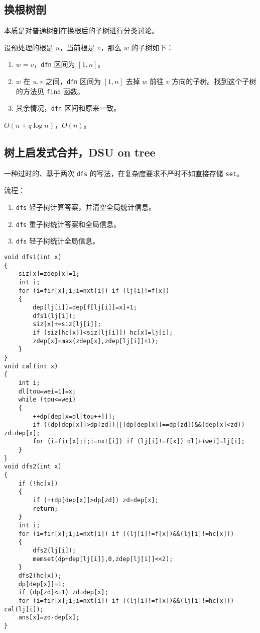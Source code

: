 \documentclass[12pt]{ctexart}
\begin{document}
\subsection{换根树剖}

本质是对普通树剖在换根后的子树进行分类讨论。

设预处理的根是 $u$，当前根是 $v$，那么 $w$ 的子树如下：

\begin{enumerate}
	\item $w=v$，\verb|dfn| 区间为 $[1,n]$。
	\item $w$ 在 $u,v$ 之间，\verb|dfn| 区间为 $[1,n]$ 去掉 $w$ 前往 $v$ 方向的子树。找到这个子树的方法见 \verb|find| 函数。
	\item 其余情况，\verb|dfn| 区间和原来一致。
\end{enumerate}

$O(n+q\log n)$，$O(n)$。

\subsection{树上启发式合并，DSU on tree}

一种过时的、基于两次 \verb|dfs| 的写法，在复杂度要求不严时不如直接存储 \verb|set|。

流程：

\begin{enumerate}
	\item \verb|dfs| 轻子树计算答案，并清空全局统计信息。
	\item \verb|dfs| 重子树统计答案和全局信息。
	\item \verb|dfs| 轻子树统计全局信息。
\end{enumerate}

\begin{lstlisting}
void dfs1(int x)
{
	siz[x]=zdep[x]=1;
	int i;
	for (i=fir[x];i;i=nxt[i]) if (lj[i]!=f[x])
	{
		dep[lj[i]]=dep[f[lj[i]]=x]+1;
		dfs1(lj[i]);
		siz[x]+=siz[lj[i]];
		if (siz[hc[x]]<siz[lj[i]]) hc[x]=lj[i];
		zdep[x]=max(zdep[x],zdep[lj[i]]+1);
	}
}
void cal(int x)
{
	int i;
	dl[tou=wei=1]=x;
	while (tou<=wei)
	{
		++dp[dep[x=dl[tou++]]];
		if ((dp[dep[x]]>dp[zd])||(dp[dep[x]]==dp[zd])&&(dep[x]<zd)) zd=dep[x];
		for (i=fir[x];i;i=nxt[i]) if (lj[i]!=f[x]) dl[++wei]=lj[i];
	}
}
void dfs2(int x)
{
	if (!hc[x])
	{
		if (++dp[dep[x]]>dp[zd]) zd=dep[x];
		return;
	}
	int i;
	for (i=fir[x];i;i=nxt[i]) if ((lj[i]!=f[x])&&(lj[i]!=hc[x]))
	{
		dfs2(lj[i]);
		memset(dp+dep[lj[i]],0,zdep[lj[i]]<<2);
	}
	dfs2(hc[x]);
	dp[dep[x]]=1;
	if (dp[zd]<=1) zd=dep[x];
	for (i=fir[x];i;i=nxt[i]) if ((lj[i]!=f[x])&&(lj[i]!=hc[x])) cal(lj[i]);
	ans[x]=zd-dep[x];
}
\end{lstlisting}
\end{document}
